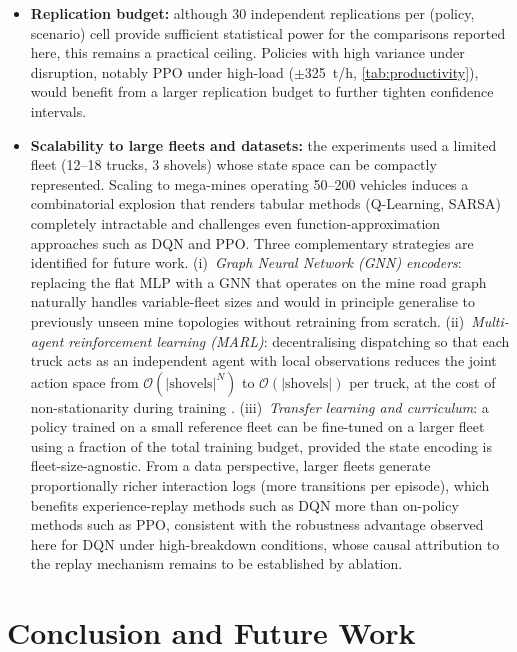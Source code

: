 \documentclass[11pt,a4paper]{article}
\begin{document}
\begin{itemize}
  \item \textbf{Replication budget:} although 30 independent replications per (policy, scenario) cell provide sufficient statistical power for the comparisons reported here, this remains a practical ceiling. Policies with high variance under disruption, notably PPO under high-load ($\pm$325~t/h, \cref{tab:productivity}), would benefit from a larger replication budget to further tighten confidence intervals.
  \item \textbf{Scalability to large fleets and datasets:} the experiments used a limited fleet (12--18 trucks, 3 shovels) whose state space can be compactly represented. Scaling to mega-mines operating 50--200 vehicles induces a combinatorial explosion that renders tabular methods (Q-Learning, SARSA) completely intractable and challenges even function-approximation approaches such as DQN and PPO. Three complementary strategies are identified for future work. (i)~\textit{Graph Neural Network (GNN) encoders}: replacing the flat MLP with a GNN that operates on the mine road graph naturally handles variable-fleet sizes and would in principle generalise to previously unseen mine topologies without retraining from scratch. (ii)~\textit{Multi-agent reinforcement learning (MARL)}: decentralising dispatching so that each truck acts as an independent agent with local observations reduces the joint action space from $\mathcal{O}(|\text{shovels}|^{N})$ to $\mathcal{O}(|\text{shovels}|)$ per truck, at the cost of non-stationarity during training \cite{Zhao2025}. (iii)~\textit{Transfer learning and curriculum}: a policy trained on a small reference fleet can be fine-tuned on a larger fleet using a fraction of the total training budget, provided the state encoding is fleet-size-agnostic. From a data perspective, larger fleets generate proportionally richer interaction logs (more transitions per episode), which benefits experience-replay methods such as DQN more than on-policy methods such as PPO, consistent with the robustness advantage observed here for DQN under high-breakdown conditions, whose causal attribution to the replay mechanism remains to be established by ablation.
\end{itemize}

\section{Conclusion and Future Work}
\label{sec:conclusion}
\end{document}
